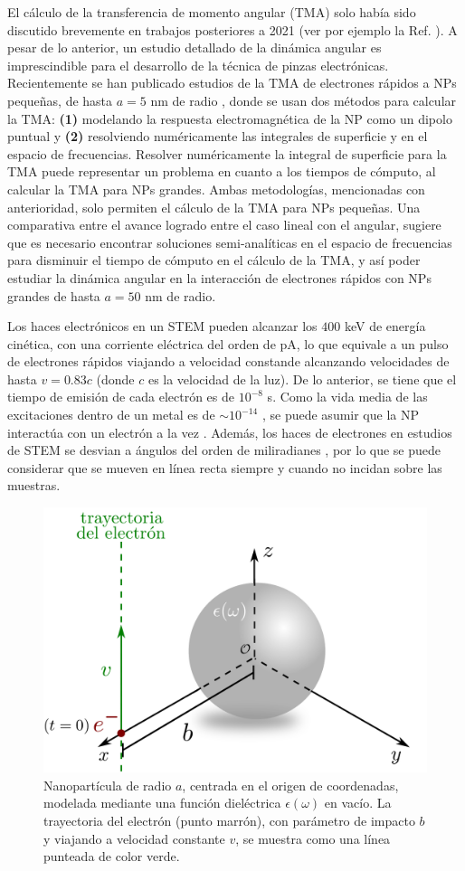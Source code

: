 \documentclass[letter,12pt]{article}
\numberwithin{equation}{section}
\begin{document}
El cálculo de la transferencia de momento angular (TMA) solo había sido discutido brevemente en trabajos posteriores a 2021 (ver por ejemplo la Ref. \cite{GarciadeAbajo-1}). A pesar de lo anterior, un estudio detallado de la dinámica angular es imprescindible para el desarrollo de la técnica de pinzas electrónicas. Recientemente se han publicado estudios de la TMA de electrones rápidos a NPs pequeñas, de hasta $a=5$ nm de radio \cite{castellanos2021phdthesis, castellanos2021angular,castellanos2023theory}, donde se usan dos métodos para calcular la TMA: \textbf{(1)} modelando la respuesta electromagnética de la NP como un dipolo puntual y \textbf{(2)} resolviendo numéricamente las integrales de superficie y en el espacio de frecuencias. Resolver numéricamente la integral de superficie para la TMA puede representar un problema en cuanto a los tiempos de cómputo, al calcular la TMA para NPs grandes. Ambas metodologías, mencionadas con anterioridad, solo permiten el cálculo de la TMA para NPs pequeñas. Una comparativa entre el avance logrado entre el caso lineal con el angular, sugiere que es necesario encontrar soluciones semi-analíticas en el espacio de frecuencias para disminuir el tiempo de cómputo en el cálculo de la TMA, y así poder estudiar la dinámica angular en la interacción de electrones rápidos con NPs grandes de hasta $a=50$ nm de radio. 

Los haces electrónicos en un STEM pueden alcanzar los $400$ keV de energía cinética, con una corriente eléctrica del orden de pA, lo que equivale a un pulso de electrones rápidos viajando a velocidad constande alcanzando velocidades de hasta $v=0.83 c$ (donde $c$ es la velocidad de la luz). De lo anterior, se tiene que el tiempo de emisión de cada electrón es de $10^{-8}$ s. Como la vida media de las excitaciones dentro de un metal es de $\sim 10^{-14}$ \cite{quijada2010lifetime}, se puede asumir que la NP interactúa con un electrón a la vez \cite{de1999relativistic, GarciadeAbajo-1, deabajo2021optical}. Además,  los haces de electrones en estudios de STEM se desvian a ángulos del orden de miliradianes \cite{deabajo2021optical, Rivacoba1, krehl2018spectral}, por lo que se puede considerar que se mueven en línea recta siempre y cuando no incidan sobre las muestras. 

\begin{figure}[ht!]
\centering
\includegraphics[width=0.5\linewidth]{17-imagenes/1-Intro/system.pdf} 
\caption{Nanopartícula de radio $a$, centrada en el origen de coordenadas, modelada mediante una función dieléctrica $\epsilon(\omega)$ en vacío. La trayectoria del electrón (punto marrón), con parámetro de impacto $b$ y viajando a velocidad constante $v$, se muestra como una línea punteada de color verde. }
\end{figure}
\end{document}
